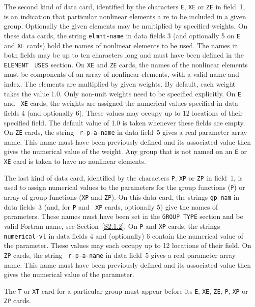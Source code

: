 \documentclass[a4paper]{article}
\begin{document}
The second kind  of data card,
identified by the characters {\tt  E},
{\tt  XE} or   {\tt ZE}
in  field~1, is  an indication that particular
nonlinear elements a
re to be included in a given group. Optionally the
given elements may be multiplied by specified weights.
On these data cards,
the string {\tt elmnt-name} in data fields 3 (and optionally 5
on {\tt E} and  {\tt XE} cards) hold  the names of nonlinear  elements
to be used.   The names in both  fields  may  be up to ten
characters long and  must have been defined  in the {\tt ELEMENT} {\tt
USES} section.  On  {\tt  XE}  and {\tt ZE}  cards, the  names  of the
nonlinear  elements must  be   components  of an   array
of nonlinear
elements, with a valid name
and index.  The elements are multiplied by
given weights. By  default,
each  weight takes  the  value 1.0.  Only
non-unit weights need to be specified explicitly.  On {\tt E} and {\tt
XE} cards,
the weights are assigned the  numerical values specified in
data fields  4  (and optionally 6). These  values may occupy up  to 12
locations of their specified field.  The default value of 1.0
is taken
whenever these fields are empty.   On {\tt ZE}  cards, the string {\tt
r-p-a-name} in  data field~5 gives  a real parameter   array name.
This name  must have been previously defined  and its associated value
then gives the numerical value of  the weight.  Any  group that is not
named  on an {\tt E} or  {\tt XE} card
is taken  to have no nonlinear elements.

The last kind of data card,
identified by the characters {\tt P}, {\tt XP} or {\tt ZP}
in field~1, is used to  assign numerical values to the
parameters  for  the group
functions ({\tt   P})  or  array
of  group
functions ({\tt XP} and {\tt ZP}). On this data card,
the strings {\tt gp-nam} in data  fields~3 (and, for {\tt P}  and {\tt
XP}  cards, optionally 5)  give the names  of  parameters.
These names
must have been set in the {\tt GROUP TYPE}
section and be valid Fortran  name,
see
Section~\ref{S2.1.2}.  On {\tt P} and {\tt XP} cards, the strings {\tt
numerical-vl} in  data   fields 4 and  (optionally)  6  contain the
numerical value of the parameter.  These values may  each occupy up to
12  locations  of their  field.  On {\tt  ZP} cards, the  string  {\tt
r-p-a-name} in data field~5 gives   a  real  parameter
array  name.
This name must have been  previously defined  and its associated value
then gives the numerical value of the parameter.

The {\tt T} or {\tt XT} card
for a particular group
must appear before its {\tt E}, {\tt XE}, {\tt ZE}, {\tt  P}, {\tt XP}
or {\tt ZP} cards.
\end{document}
